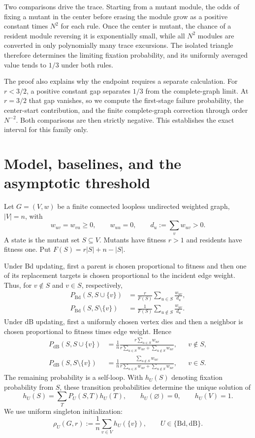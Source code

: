 \documentclass[11pt]{article}
\theoremstyle{definition}
\theoremstyle{remark}
\newcommand{\Bd}{\mathrm{Bd}}
\newcommand{\dB}{\mathrm{dB}}
\begin{document}
Two comparisons drive the trace.  Starting from a mutant module, the odds of
fixing a mutant in the center before erasing the module grow as a positive
constant times $N^2$ for each rule.  Once the center is mutant, the chance of
a resident module reversing it is exponentially small, while all $N^2$
modules are converted in only polynomially many trace excursions.  The
isolated triangle therefore determines the limiting fixation probability,
and its uniformly averaged value tends to $1/3$ under both rules.

The proof also explains why the endpoint requires a separate calculation.
For $r<3/2$, a positive constant gap separates $1/3$ from the complete-graph
limit.  At $r=3/2$ that gap vanishes, so we compute the first-stage failure
probability, the center-start contribution, and the finite complete-graph
correction through order $N^{-2}$.  Both comparisons are then strictly
negative.  This establishes the exact interval for this family only.

\section{Model, baselines, and the asymptotic threshold}

Let $G=(V,w)$ be a finite connected loopless undirected weighted graph,
$|V|=n$, with
\[
 w_{uv}=w_{vu}\geq0,\qquad w_{uu}=0,
 \qquad d_u:=\sum_v w_{uv}>0.
\]
A state is the mutant set $S\subseteq V$.  Mutants have fitness $r>1$ and
residents have fitness one.  Put $F(S)=r|S|+n-|S|$.

Under Bd updating, first a parent is chosen proportional to fitness and then
one of its replacement targets is chosen proportional to the incident edge
weight.  Thus, for $v\notin S$ and $v\in S$, respectively,
\begin{align}
 P_{\Bd}(S,S\cup\{v\})
 &=\frac{r}{F(S)}\sum_{u\in S}\frac{w_{uv}}{d_u},
 \label{eq:Bd-up}\\
 P_{\Bd}(S,S\setminus\{v\})
 &=\frac{1}{F(S)}\sum_{u\notin S}\frac{w_{uv}}{d_u}.
 \label{eq:Bd-down}
\end{align}
Under dB updating, first a uniformly chosen vertex dies and then a neighbor
is chosen proportional to fitness times edge weight.  Hence
\begin{align}
 P_{\dB}(S,S\cup\{v\})
 &=\frac1n\frac{r\sum_{u\in S}w_{uv}}
 {r\sum_{u\in S}w_{uv}+\sum_{u\notin S}w_{uv}},
 &&v\notin S,\label{eq:dB-up}\\
 P_{\dB}(S,S\setminus\{v\})
 &=\frac1n\frac{\sum_{u\notin S}w_{uv}}
 {r\sum_{u\in S}w_{uv}+\sum_{u\notin S}w_{uv}},
 &&v\in S.\label{eq:dB-down}
\end{align}
The remaining probability is a self-loop.  With $h_U(S)$ denoting fixation
probability from $S$, these transition probabilities determine the unique
solution of
\[
 h_U(S)=\sum_TP_U(S,T)h_U(T),\qquad
 h_U(\varnothing)=0,\qquad h_U(V)=1.
\]
We use uniform singleton initialization:
\[
 \rho_U(G,r):=\frac1n\sum_{v\in V}h_U(\{v\}),
 \qquad U\in\{\Bd,\dB\}.
\]
\end{document}
